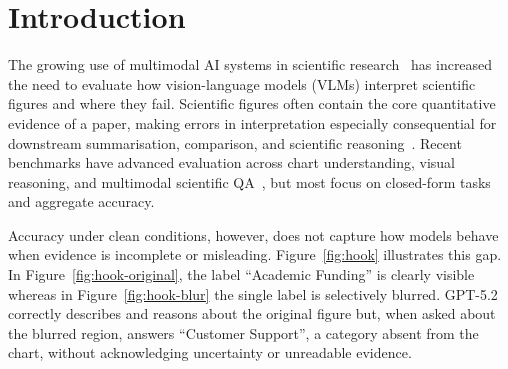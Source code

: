 \section{Introduction}
\label{sec:introduction}

The growing use of multimodal AI systems in scientific research~\citep{yan2025multimodalscience,hu2025scientificllms,Eger2025TransformingSW,greisinger2026tikzilla,zhang2025scimage} has increased the need to evaluate how vision-language models (VLMs) interpret scientific figures and where they fail. Scientific figures often contain the core quantitative evidence of a paper, making errors in interpretation especially consequential for downstream summarisation, comparison, and scientific reasoning~\citep{wang2024charxiv,roberts2024scifibench,tang2025chartmuseum}. Recent benchmarks have advanced evaluation across chart understanding, visual reasoning, and multimodal scientific QA~\citep{masry2022chartqa,lu2024mathvista,yue2024mmmu,wang2024charxiv,tang2025chartmuseum}, but most focus on closed-form tasks and aggregate accuracy.

Accuracy under clean conditions, however, does not capture how models behave when evidence is incomplete or misleading. Figure~\ref{fig:hook} illustrates this gap. In Figure~\ref{fig:hook-original},
the label ``Academic Funding'' is clearly visible whereas in Figure~\ref{fig:hook-blur} 
the single label is selectively blurred. GPT-5.2 correctly describes and reasons about the original figure but, when asked about the blurred region, answers ``Customer Support'', a category absent from the chart, without acknowledging uncertainty or unreadable evidence. 

